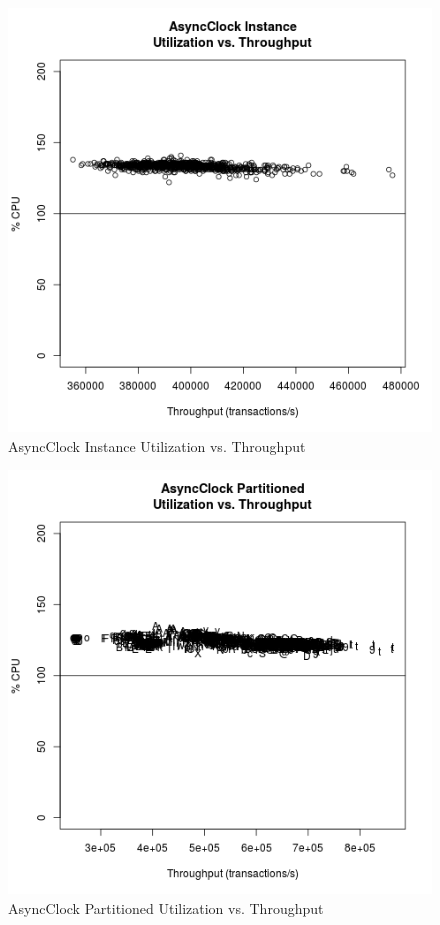 \begin{figure}
\center
\includegraphics[height=.4\textheight]{async_instance_throughput_utilization.png}
\caption{AsyncClock Instance Utilization vs. Throughput}
\label{async_instance_throughput_utilization}
\end{figure}

\begin{figure}
\center
\includegraphics[height=.4\textheight]{async_partitioned_throughput_utilization.png}
\caption{AsyncClock Partitioned Utilization vs. Throughput}
\label{async_partitioned_throughput_utilization}
\end{figure}

